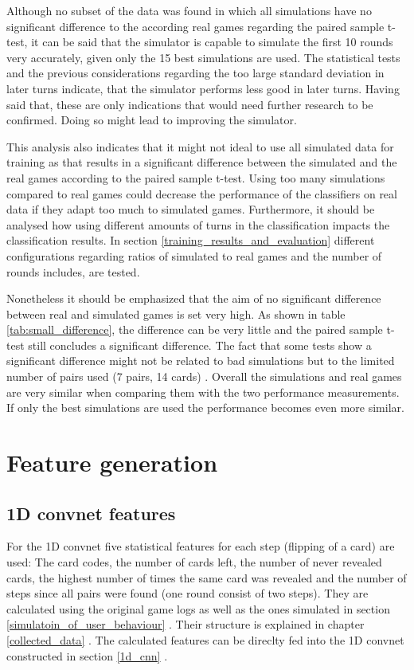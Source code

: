 Although no subset of the data was found in which all simulations have no significant difference to the according real games regarding the paired sample t-test, it can be said that the simulator is capable to simulate the first 10 rounds very accurately, given only the 15 best simulations are used. The statistical tests and the previous considerations regarding the too large standard deviation in later turns indicate, that the simulator performs less good in later turns. Having said that, these are only indications that would need further research to be confirmed. Doing so might lead to improving the simulator. 

This analysis also indicates that it might not ideal to use all simulated data for training as that results in a significant difference between the simulated and the real games according to the paired sample t-test. Using too many simulations compared to real games could decrease the performance of the classifiers on real data if they adapt too much to simulated games. Furthermore, it should be analysed how using different amounts of turns in the classification impacts the classification results. In section \ref{training_results_and_evaluation}  different configurations regarding ratios of simulated to real games and the number of rounds includes, are tested. 

Nonetheless it should be emphasized that the aim of no significant difference between real and simulated games is set very high. As shown in table \ref{tab:small_difference}, the difference can be very little and the paired sample t-test still concludes a significant difference. The fact that some tests show a significant difference might not be related to bad simulations but to the limited number of pairs used (7 pairs, 14 cards) \cite[p.~6]{blind}. Overall the simulations and real games are very similar when comparing them with the two performance measurements. If only the best simulations are used the performance becomes even more similar.  

\newpage

\section{Feature generation}
\label{feature_generation}

\subsection{1D convnet features}
\label{1d_cnn_features}
For the 1D convnet five statistical features for each step (flipping of a card) are used: The card codes, the number of cards left, the number of never revealed cards,  the highest number of times the same card was revealed and the number of steps since all pairs were found (one round consist of two steps). They are calculated using the original game logs as well as the ones simulated in section \ref{simulatoin_of_user_behaviour} . Their structure is explained in chapter \ref{collected_data} . The calculated features can be direclty fed into the 1D convnet constructed in section \ref{1d_cnn} . 

